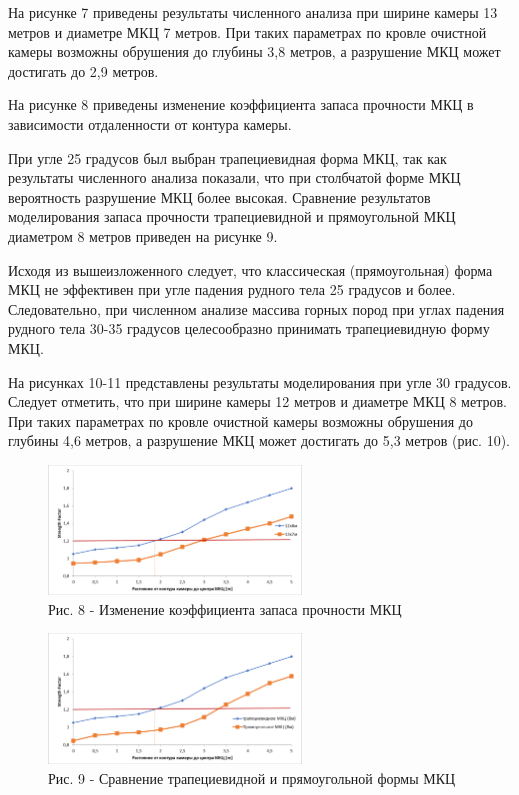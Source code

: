 \begin{multicols}{2}
На рисунке 7 приведены результаты численного анализа при ширине камеры
13 метров и диаметре МКЦ 7 метров. При таких параметрах по кровле
очистной камеры возможны обрушения до глубины 3,8 метров, а разрушение
МКЦ может достигать до 2,9 метров.

На рисунке 8 приведены изменение коэффициента запаса прочности МКЦ в
зависимости отдаленности от контура камеры.

При угле 25 градусов был выбран трапециевидная форма МКЦ, так как
результаты численного анализа показали, что при столбчатой форме МКЦ
вероятность разрушение МКЦ более высокая. Сравнение результатов
моделирования запаса прочности трапециевидной и прямоугольной МКЦ
диаметром 8 метров приведен на рисунке 9.

Исходя из вышеизложенного следует, что классическая (прямоугольная)
форма МКЦ не эффективен при угле падения рудного тела 25 градусов и
более. Следовательно, при численном анализе массива горных пород при
углах падения рудного тела 30-35 градусов целесообразно принимать
трапециевидную форму МКЦ.

На рисунках 10-11 представлены результаты моделирования при угле 30
градусов. Следует отметить, что при ширине камеры 12 метров и диаметре
МКЦ 8 метров. При таких параметрах по кровле очистной камеры возможны
обрушения до глубины 4,6 метров, а разрушение МКЦ может достигать до 5,3
метров (рис. 10).
\end{multicols}

\begin{figure}[H]
	\centering
	\includegraphics[width=0.6\textwidth]{assets/288}
	\caption*{Рис. 8 - Изменение коэффициента запаса прочности МКЦ}
\end{figure}

\begin{figure}[H]
	\centering
	\includegraphics[width=0.6\textwidth]{assets/289}
	\caption*{Рис. 9 - Сравнение трапециевидной и прямоугольной формы МКЦ}
\end{figure}

